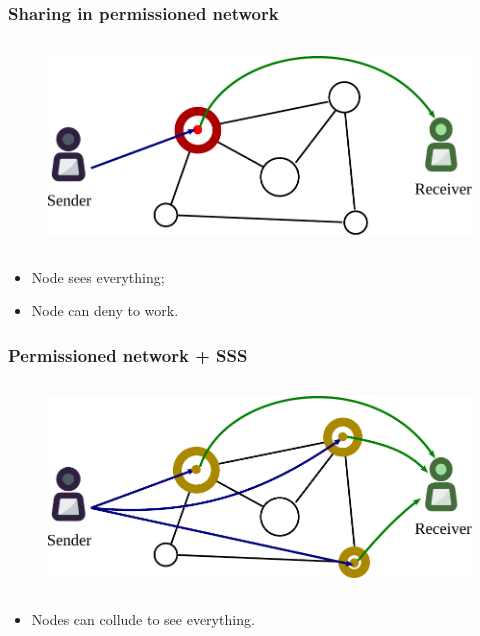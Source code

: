 \documentclass[xetex,mathsans,sans,aspectratio=169]{beamer}
\begin{document}
 \begin{frame}
        \frametitle{Sharing in permissioned network}
        \begin{figure}
            \centering
            \includegraphics[height=5.5cm]{pdf/permissioned.pdf}
        \end{figure}
        \begin{itemize}
            \item Node sees everything;
            \item Node can deny to work.
        \end{itemize}
    \end{frame}

    \begin{frame}
        \frametitle{Permissioned network + SSS}
        \begin{figure}
            \centering
            \includegraphics[height=5.5cm]{pdf/permissioned-sss.pdf}
        \end{figure}
        \begin{itemize}
            \item Nodes can collude to see everything.
        \end{itemize}
    \end{frame}
\end{document}
